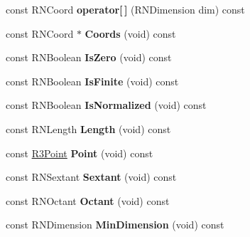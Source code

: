 \begin{DoxyCompactItemize}
\item 
const R\+N\+Coord {\bfseries operator\mbox{[}$\,$\mbox{]}} (R\+N\+Dimension dim) const \hypertarget{class_r3_vector_a289d1bdc0eabb6b2ed69075a3d0e26f7}{}\label{class_r3_vector_a289d1bdc0eabb6b2ed69075a3d0e26f7}

\item 
const R\+N\+Coord $\ast$ {\bfseries Coords} (void) const \hypertarget{class_r3_vector_a639d9784394820b3496eba0703e37ffc}{}\label{class_r3_vector_a639d9784394820b3496eba0703e37ffc}

\item 
const R\+N\+Boolean {\bfseries Is\+Zero} (void) const \hypertarget{class_r3_vector_a94ed7946d2bdb57c2f4560ac22fafed9}{}\label{class_r3_vector_a94ed7946d2bdb57c2f4560ac22fafed9}

\item 
const R\+N\+Boolean {\bfseries Is\+Finite} (void) const \hypertarget{class_r3_vector_a29351a0802f2299b127a6efb73a3ceb3}{}\label{class_r3_vector_a29351a0802f2299b127a6efb73a3ceb3}

\item 
const R\+N\+Boolean {\bfseries Is\+Normalized} (void) const \hypertarget{class_r3_vector_ace2c7cd3580699b68e3545cb16d2e61b}{}\label{class_r3_vector_ace2c7cd3580699b68e3545cb16d2e61b}

\item 
const R\+N\+Length {\bfseries Length} (void) const \hypertarget{class_r3_vector_a251f3ac5e8008d84d285d19da8054d40}{}\label{class_r3_vector_a251f3ac5e8008d84d285d19da8054d40}

\item 
const \hyperlink{class_r3_point}{R3\+Point} {\bfseries Point} (void) const \hypertarget{class_r3_vector_af6a9114bcb73bedf6b5f01499f794a1c}{}\label{class_r3_vector_af6a9114bcb73bedf6b5f01499f794a1c}

\item 
const R\+N\+Sextant {\bfseries Sextant} (void) const \hypertarget{class_r3_vector_a823faf592902597fabb0ca75c5fc6cb1}{}\label{class_r3_vector_a823faf592902597fabb0ca75c5fc6cb1}

\item 
const R\+N\+Octant {\bfseries Octant} (void) const \hypertarget{class_r3_vector_a8a3f08b1583641e81422d92c2b226ce7}{}\label{class_r3_vector_a8a3f08b1583641e81422d92c2b226ce7}

\item 
const R\+N\+Dimension {\bfseries Min\+Dimension} (void) const \hypertarget{class_r3_vector_a16d03aa29793131d246367cc6543fef4}{}\label{class_r3_vector_a16d03aa29793131d246367cc6543fef4}


\end{DoxyCompactItemize}
